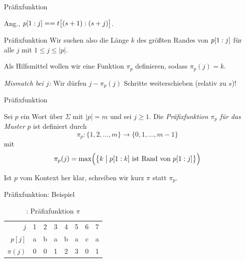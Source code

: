 \documentclass[xcolor=dvipsnames, aspectratio=169]{beamer}
\begin{document}
\begin{frame}{Präfixfunktion}
\begin{center}
{}
\end{center}\medskip

Ang., $p[1: j] == t\big[(s+1):(s+j)\big]$. 
\end{frame}

\begin{frame}{Präfixfunktion}
Wir suchen also die Länge $k$ des größten Randes von $p[1: j]$ für alle $j$ mit $1\leq j\leq\vert p\vert$.\bigskip\pause

Als Hilfsmittel wollen wir eine Funktion $\pi_p$ definieren, sodass $\pi_p(j)=k$.\bigskip\pause

\textit{Mismatch bei $j$:} Wir dürfen $j-\pi_p(j)$ Schritte weiterschieben (relativ zu $s$)!
\end{frame}

\begin{frame}{Präfixfunktion}
\begin{defi}
Sei $p$ ein Wort über $\Sigma$ mit $\vert p\vert=m$ und sei $j\geq 1$. Die \emph{Präfixfunktion $\pi_p$ für das Muster $p$} ist definiert durch \[\pi_p\colon\{1,2,\dots,m\}\to\{0,1,\dots,m-1\}\] mit
\[\pi_p(j)=\mathrm{max}\Big(\big\{k\;\big\vert\;p[1: k]\text{ ist Rand von }p[1: j]\big\}\Big)\]
\end{defi}\medskip

Ist $p$ vom Kontext her klar, schreiben wir kurz $\pi$ statt $\pi_p$.
\end{frame}

\begin{frame}{Präfixfunktion: Beispiel}
\begin{table}\setlength\extrarowheight{.3em}
\begin{tabular}{r@{\hskip 2em}ccccccc}
\toprule
$j$ & 1 & 2 & 3 & 4 & 5 & 6 & 7 \\ 
$p[j]$ & a & b & a & b & a & c & a \\ 
$\pi(j)$ & 0 & 0 & 1 & 2 & 3 & 0 & 1 \\ 
\bottomrule
\end{tabular}
\caption{\cite{cormenalgorithms2009}: Präfixfunktion $\pi$}
\end{table}
\end{frame}
\end{document}
